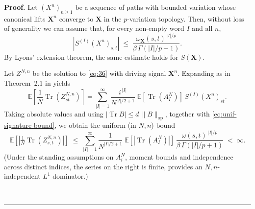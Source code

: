 \documentclass{article}%
\newenvironment{proof}[1][Proof]{\noindent\textbf{#1.} }{\ \rule{0.5em}{0.5em}}
\begin{document}
\begin{proof}
Let \((X^n)_{n\ge1}\) be a sequence of paths with bounded variation whose canonical lifts
\(\mathbf X^n\) converge to \(\mathbf X\) in the \(p\)-variation topology. Then, without loss of generality we can assume that, for every non-empty word \(I\) and all \(n\),
\begin{equation}\label{eq:unif-signature-bound}
\left|S^{(I)}(X^n)_{s,t}\right|
\;\le\;
\frac{\omega_{\mathbf{X}}(s,t)^{\,|I|/p}}{\beta\,\Gamma\!\left(|I|/p+1\right)}.
\end{equation}
By Lyons’ extension theorem, the same estimate holds for \(S(\mathbf X)\).

Let \(Z^{N,n}\) be the solution to \eqref{eq:36} with driving signal \(\mathbf X^n\). Expanding as in Theorem~2.1 in \cite{cass2024free} yields
\[
\mathbb E\!\left[\frac{1}{N}\operatorname{Tr}(Z^{N,n}_{st})\right]
=
\sum_{|I|=1}^{\infty}
\frac{i^{\,|I|}}{N^{|I|/2+1}}\;
\mathbb E\!\left[\operatorname{Tr}(A_I^N)\right]\,
S^{(I)}(X^n)_{st}.
\]
Taking absolute values and using \(|\operatorname{Tr}B|\le d\,\|B\|_{\mathrm{op}}\), together with
\eqref{eq:unif-signature-bound}, we obtain the uniform (in \(N,n\)) bound
\begin{equation}\label{eq:series-bound}
\mathbb E\!\left[\left|\tfrac{1}{N}\operatorname{Tr}(Z^{N,n}_{s,t})\right|\right]
\;\le\;
\sum_{|I|=1}^{\infty}
\frac{1}{N^{|I|/2+1}}\;
\mathbb E\!\left[\left|\operatorname{Tr}(A_I^N)\right|\right]\,
\frac{\omega(s,t)^{\,|I|/p}}{\beta\,\Gamma\!\left(|I|/p+1\right)}
\;<\;\infty.
\end{equation}
(Under the standing assumptions on \(A_i^N\), moment bounds and
independence across distinct indices, the series on the right is finite,
provides an \(N,n\)-independent \(L^1\) dominator.)


\end{proof}
\end{document}
